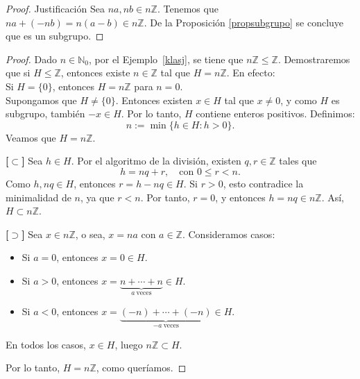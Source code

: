\begin{ejemplo}\label{klasj}
\end{ejemplo}
\begin{proof}{Justificación}
	Sea $na,nb\in n\mathbb{Z}$. Tenemos que $na+(-nb)=n(a-b)\in n\mathbb{Z}.$ De la Proposición \ref{propsubgrupo} se concluye que es un subgrupo.
\end{proof}

\begin{proposicion}
\end{proposicion}


\begin{proof}
	Dado \( n \in \mathbb{N}_0 \), por el Ejemplo~\ref{klasj}, se tiene que \( n\mathbb{Z} \leq \mathbb{Z} \). Demostraremos que si \( H \leq \mathbb{Z} \), entonces existe \( n \in \mathbb{Z} \) tal que \( H = n\mathbb{Z} \). En efecto:\\
	
	\noindent Si \( H = \{0\} \), entonces \( H = n\mathbb{Z} \) para $n=0$.\\
	
	\noindent Supongamos que \( H \neq \{0\} \). Entonces existen \( x \in H \) tal que \( x \neq 0 \), y como \( H \) es subgrupo, también \( -x \in H \). Por lo tanto, \( H \) contiene enteros positivos. Definimos:
	\[
	n := \min \{ h \in H : h > 0 \}.
	\]
	Veamos que \( H = n\mathbb{Z} \).
	
	\medskip
	\noindent \textbf{[$\subset$]} Sea \( h \in H \). Por el algoritmo de la división, existen \( q, r \in \mathbb{Z} \) tales que
	\[
	h = nq + r, \quad \text{con } 0 \leq r < n.
	\]
	Como \( h, nq \in H \), entonces \( r = h - nq \in H \). Si \( r > 0 \), esto contradice la minimalidad de \( n \), ya que \( r < n \). Por tanto, \( r = 0 \), y entonces \( h = nq \in n\mathbb{Z} \). Así, \( H \subset n\mathbb{Z} \).
	
	\medskip
	\noindent \textbf{[$\supset$]} Sea \( x \in n\mathbb{Z} \), o sea, \( x = na \) con \( a \in \mathbb{Z} \). Consideramos casos:
	\begin{itemize}
		\item Si \( a = 0 \), entonces \( x = 0 \in H \).
		\item Si \( a > 0 \), entonces \( x = \underbrace{n + \cdots + n}_{a\ \text{veces}} \in H \).
		\item Si \( a < 0 \), entonces \( x = \underbrace{(-n) + \cdots + (-n)}_{-a\ \text{veces}} \in H \).
	\end{itemize}
	
	\noindent En todos los casos, \( x \in H \), luego \( n\mathbb{Z} \subset H \).
	
	\medskip
	\noindent Por lo tanto, \( H = n\mathbb{Z} \), como queríamos.
\end{proof}


